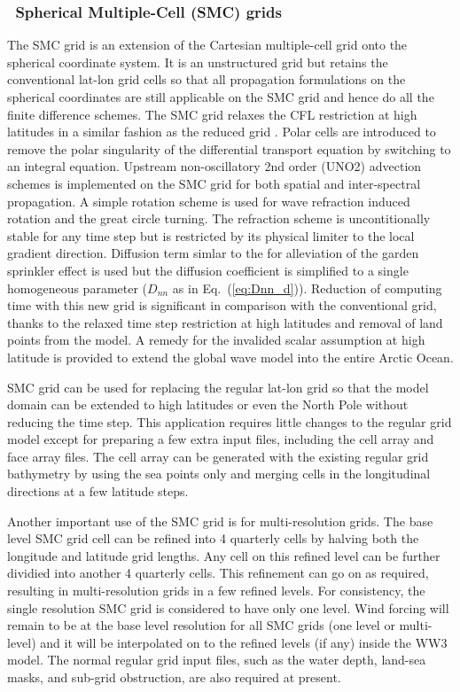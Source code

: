 \vssub
\subsubsection{~Spherical Multiple-Cell (SMC) grids} \label{sub:num_space_SMC}

\noindent
The SMC grid \citep{art:Li11} is an extension of the Cartesian multiple-cell
grid \citep{art:Li03} onto the spherical coordinate system. It is an unstructured
grid but retains the conventional lat-lon grid cells so that all propagation
formulations on the spherical coordinates are still applicable on
the SMC grid and hence do all the finite difference schemes. The SMC
grid relaxes the CFL restriction at high latitudes in a similar fashion
as the reduced grid \citep{art:RA94}. Polar cells are introduced to remove
the polar singularity of the differential transport equation by switching
to an integral equation. Upstream non-oscillatory 2nd order (UNO2)
advection schemes \citep{art:Li08} is implemented on the SMC grid for both
spatial and inter-spectral propagation. A simple rotation scheme is
used for wave refraction induced rotation and the great circle turning.
The refraction scheme is uncontitionally stable for any time step
but is restricted by its physical limiter to the local gradient direction.
Diffusion term simlar to the \cite{art:BH87} for alleviation
of the garden sprinkler effect is used but the diffusion coefficient
is simplified to a single homogeneous parameter ($D_{nn}$ as in Eq.~(\ref{eq:Dnn_d})).
Reduction of computing time with this new grid is significant in comparison
with the conventional grid, thanks to the relaxed time step restriction
at high latitudes and removal of land points from the model. A remedy
for the invalided scalar assumption at high latitude is provided to
extend the global wave model into the entire Arctic Ocean.

SMC grid can be used for replacing the regular lat-lon grid so that
the model domain can be extended to high latitudes or even the North
Pole without reducing the time step. This application requires little
changes to the regular grid model except for preparing a few extra
input files, including the cell array and face array files. The cell
array can be generated with the existing regular grid bathymetry by
using the sea points only and merging cells in the longitudinal directions
at a few latitude steps. 

Another important use of the SMC grid is for multi-resolution grids.
The base level SMC grid cell can be refined into 4 quarterly cells
by halving both the longitude and latitude grid lengths. Any cell
on this refined level can be further dividied into another 4 quarterly
cells. This refinement can go on as required, resulting in multi-resolution
grids in a few refined levels. For consistency, the single resolution
SMC grid is considered to have only one level. Wind forcing will remain
to be at the base level resolution for all SMC grids (one level or
multi-level) and it will be interpolated on to the refined levels
(if any) inside the WW3 model. The normal regular grid input files,
such as the water depth, land-sea masks, and sub-grid obstruction,
are also required at present. 

